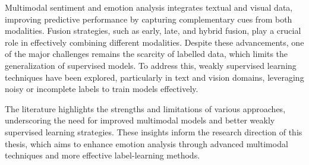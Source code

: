 Multimodal sentiment and emotion analysis integrates textual and visual data, improving predictive performance by capturing complementary cues from both modalities. Fusion strategies, such as early, late, and hybrid fusion, play a crucial role in effectively combining different modalities. Despite these advancements, one of the major challenges remains the scarcity of labelled data, which limits the generalization of supervised models. To address this, weakly supervised learning techniques have been explored, particularly in text and vision domains, leveraging noisy or incomplete labels to train models effectively.
\newline

The literature highlights the strengths and limitations of various approaches, underscoring the need for improved multimodal models and better weakly supervised learning strategies. These insights inform the research direction of this thesis, which aims to enhance emotion analysis through advanced multimodal techniques and more effective label-learning methods.
